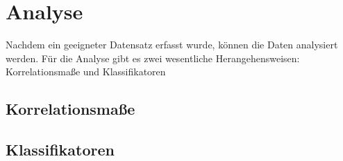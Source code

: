 \section{Analyse}
\label{sec:analyse}
Nachdem ein geeigneter Datensatz erfasst wurde, können die Daten analysiert werden.
Für die Analyse gibt es zwei wesentliche Herangehensweisen: Korrelationsmaße und Klassifikatoren

\subsection{Korrelationsmaße}

\subsection{Klassifikatoren}

